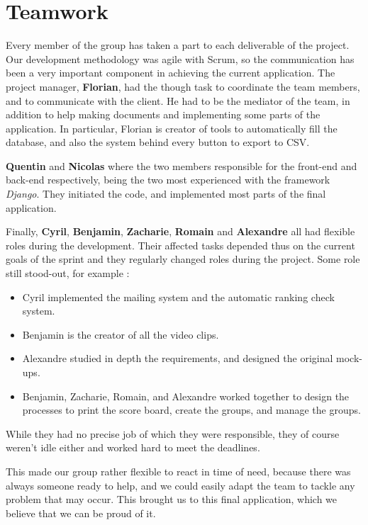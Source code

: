 \section{Teamwork}
\label{sec:Teamwork}


Every member of the group has taken a part to each deliverable of the project.
Our development methodology was agile with Scrum, so the communication has
been a very important component in achieving the current application.
The project manager, \textbf{Florian}, had the though task to coordinate the
team members, and to communicate with the client. He had to be the mediator of
the team, in addition to help making documents and implementing some parts of
the application. In particular, Florian is creator of tools to automatically
fill the database, and also the system behind every button to export to CSV.\newline

\textbf{Quentin} and \textbf{Nicolas} where the two members responsible for
the front-end and back-end respectively, being the two most experienced with
the framework \textit{Django}. They initiated the code, and implemented most
parts of the final application.\newline

Finally, \textbf{Cyril}, \textbf{Benjamin}, \textbf{Zacharie}, \textbf{Romain}
and \textbf{Alexandre} all had flexible roles during the development.
Their affected tasks depended thus on the current goals of the sprint and they 
regularly changed roles during the project. Some role still stood-out, for example :

\begin{itemize}
\item Cyril implemented the mailing system  and the automatic ranking check system.
\item Benjamin is the creator of all the video clips.
\item Alexandre studied in depth the requirements, and designed the original mock-ups.
\item Benjamin, Zacharie, Romain, and Alexandre worked together to design the
processes to print the score board, create the groups, and manage the groups.
\end{itemize}
\bigskip

While they had no precise job of which they were responsible, they of course
weren't idle either and worked hard to meet the deadlines.\newline

This made our group rather flexible to react in time of need, because there was
always someone ready to help, and we could easily adapt the team to tackle any
problem that may occur. This brought us to this final application, which we
believe that we can be proud of it.

